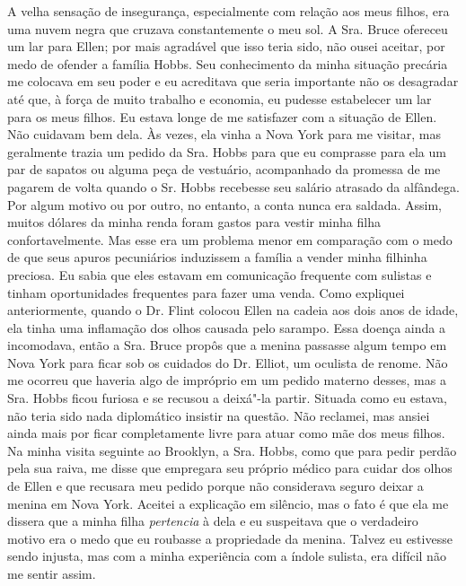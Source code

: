 A velha sensação de insegurança,
especialmente com relação aos meus filhos, era uma nuvem negra que
cruzava constantemente o meu sol. A Sra. Bruce ofereceu um lar para
Ellen; por mais agradável que isso teria sido, não ousei aceitar, por
medo de ofender a família Hobbs. Seu conhecimento da minha situação
precária me colocava em seu poder e eu acreditava que seria importante
não os desagradar até que, à força de muito trabalho e economia, eu
pudesse estabelecer um lar para os meus filhos. Eu estava longe de me
satisfazer com a situação de Ellen. Não cuidavam bem dela. Às vezes, ela
vinha a Nova York para me visitar, mas geralmente trazia um pedido da
Sra. Hobbs para que eu comprasse para ela um par de sapatos ou alguma
peça de vestuário, acompanhado da promessa de me pagarem de volta quando
o Sr. Hobbs recebesse seu salário atrasado da alfândega. Por algum
motivo ou por outro, no entanto, a conta nunca era saldada. Assim,
muitos dólares da minha renda foram gastos para vestir minha filha
confortavelmente. Mas esse era um problema menor em comparação com o
medo de que seus apuros pecuniários induzissem a família a vender minha
filhinha preciosa. Eu sabia que eles estavam em comunicação frequente
com sulistas e tinham oportunidades frequentes para fazer uma venda.
Como expliquei anteriormente, quando o Dr. Flint colocou Ellen na cadeia
aos dois anos de idade, ela tinha uma inflamação dos olhos causada pelo
sarampo. Essa doença ainda a incomodava, então a Sra. Bruce propôs que a
menina passasse algum tempo em Nova York para ficar sob os cuidados do
Dr. Elliot, um oculista de renome. Não me ocorreu que haveria algo de
impróprio em um pedido materno desses, mas a Sra. Hobbs ficou furiosa e
se recusou a deixá"-la partir. Situada como eu estava, não teria sido
nada diplomático insistir na questão. Não reclamei, mas ansiei ainda
mais por ficar completamente livre para atuar como mãe dos meus filhos.
Na minha visita seguinte ao Brooklyn, a Sra. Hobbs, como que para pedir
perdão pela sua raiva, me disse que empregara seu próprio médico para
cuidar dos olhos de Ellen e que recusara meu pedido porque não
considerava seguro deixar a menina em Nova York. Aceitei a explicação em
silêncio, mas o fato é que ela me dissera que a minha filha
\emph{pertencia} à dela e eu suspeitava que o verdadeiro motivo era o
medo que eu roubasse a propriedade da menina. Talvez eu estivesse sendo
injusta, mas com a minha experiência com a índole sulista, era difícil
não me sentir assim.

